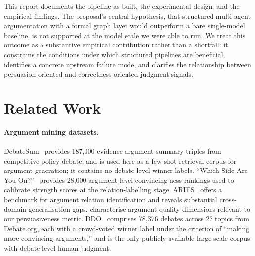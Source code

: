 \documentclass[11pt,twocolumn,letterpaper]{article}
\newcommand{\DebateSumArgs}{187{,}000}
\newcommand{\WhichSideArgs}{28{,}000}
\newcommand{\DDOTotal}{78{,}376}
\newcommand{\DDOTopics}{23}
\begin{document}
This report documents the pipeline as built, the experimental
design, and the empirical findings. The proposal's central hypothesis,
that structured multi-agent argumentation with a formal graph layer
would outperform a bare single-model baseline, is not supported at
the model scale we were able to run. We treat this outcome as a
substantive empirical contribution rather than a shortfall: it
constrains the conditions under which structured pipelines are
beneficial, identifies a concrete upstream failure mode, and clarifies
the relationship between persuasion-oriented and correctness-oriented
judgment signals.

\section{Related Work}

\paragraph{Argument mining datasets.}
DebateSum~\citep{roush2020debatesum} provides \DebateSumArgs{}
evidence-argument-summary triples from competitive policy debate,
and is used here as a few-shot retrieval corpus for argument
generation; it contains no debate-level winner labels.
``Which Side Are You On?''~\citep{li2024whichside} provides
\WhichSideArgs{} argument-level convincing-ness rankings used to
calibrate strength scores at the relation-labelling stage.
ARIES~\citep{gemechu2024aries} offers a benchmark for argument
relation identification and reveals substantial cross-domain
generalisation gaps. \citet{ivanova2024lets} characterise argument
quality dimensions relevant to our persuasiveness metric.
DDO~\citep{durmus2019ddo} comprises \DDOTotal{} debates across
\DDOTopics{} topics from Debate.org, each with a crowd-voted winner
label under the criterion of ``making more convincing arguments,''
and is the only publicly available large-scale corpus with
debate-level human judgment.
\end{document}
